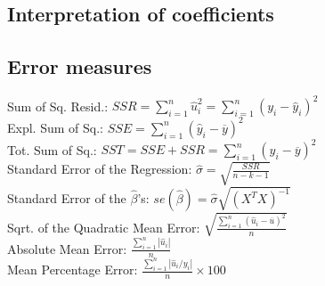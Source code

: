 \documentclass[10pt, a4paper, landscape]{extarticle}
\begin{document}
\begin{multicols}{3}
	\subsection*{Interpretation of coefficients}
	\subsection*{Error measures}
		Sum of Sq. Resid.: \hfill $SSR = \sum_{i=1}^n \hat{u}_i^2 = \sum_{i=1}^n (y_i - \hat{y}_i)^2$
		\\ Expl. Sum of Sq.: \hfill $SSE = \sum_{i=1}^n (\hat{y}_i - \overline{y})^2$
		\\ Tot. Sum of Sq.: \hfill $SST = SSE + SSR = \sum_{i=1}^n (y_i - \overline{y})^2$
		\\ Standard Error of the Regression: \hfill $\hat{\sigma} = \sqrt{\frac{SSR}{n-k-1}}$
		\\ Standard Error of the $\hat{\beta}$'s: \hfill $se(\hat{\beta}) = \hat{\sigma} \sqrt{(X^T X)^{-1}}$
		\\ Sqrt. of the Quadratic Mean Error: \hfill $\sqrt{\frac{\sum_{i=1}^n (\hat{u}_i - \overline{u})^2}{n}}$
		\\ Absolute Mean Error: \hfill $\frac{\sum_{i=1}^n |\hat{u}_i|}{n}$
		\\ Mean Percentage Error: \hfill $\frac{\sum_{i=1}^n |\hat{u}_i / y_i|}{n} \times 100$
\columnbreak

\end{multicols}
\end{document}
